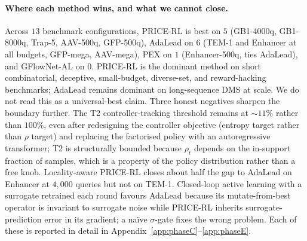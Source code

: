 \paragraph{Where each method wins, and what we cannot close.} Across $13$ benchmark configurations, PRICE-RL is best on $5$ (GB1-4000q, GB1-8000q, Trap-5, AAV-500q, GFP-500q), AdaLead on $6$ (TEM-1 and Enhancer at all budgets, GFP-mega, AAV-mega), PEX on $1$ (Enhancer-500q, ties AdaLead), and GFlowNet-AL on $0$. PRICE-RL is the dominant method on short combinatorial, deceptive, small-budget, diverse-set, and reward-hacking benchmarks; AdaLead remains dominant on long-sequence DMS at scale. We do not read this as a universal-best claim. Three honest negatives sharpen the boundary further. The T2 controller-tracking threshold remains at $\sim 11\%$ rather than $100\%$, even after redesigning the controller objective (entropy target rather than $\rho$ target) and replacing the factorised policy with an autoregressive transformer; T2 is structurally bounded because $\rho_t$ depends on the in-support fraction of samples, which is a property of the policy distribution rather than a free knob. Locality-aware PRICE-RL closes about half the gap to AdaLead on Enhancer at $4{,}000$ queries but not on TEM-1. Closed-loop active learning with a surrogate retrained each round favours AdaLead because its mutate-from-best operator is invariant to surrogate noise while PRICE-RL inherits surrogate-prediction error in its gradient; a naïve $\sigma$-gate fixes the wrong problem. Each of these is reported in detail in Appendix~\ref{app:phaseC}--\ref{app:phaseE}.
